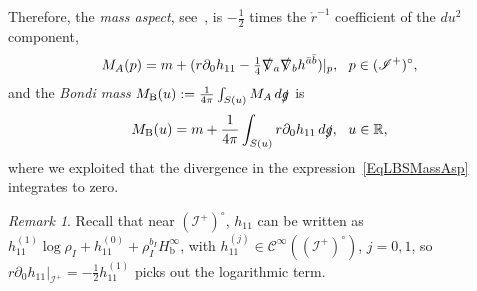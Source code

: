 \documentclass[reqno,11pt,letterpaper]{amsart}
\numberwithin{equation}{section}
\numberwithin{figure}{section}
\theoremstyle{definition}
\theoremstyle{remark}
\newtheorem{rmk}[thm]{Remark}
\newcommand{\mc}{\mathcal}
\newcommand{\cC}{\mc C}
\newcommand{\ms}{\mathscr}
\newcommand{\scri}{\ms I}
\newcommand{\R}{\mathbb{R}}
\newcommand{\slg}{\slashed{g}{}}
\newcommand{\slnabla}{\slashed{\nabla}{}}
\newcommand{\pa}{\partial}
\newcommand{\bop}{{\mathrm{b}}}
\newcommand{\half}{\tfrac{1}{2}}
\newcommand{\CI}{\cC^\infty}
\newcommand{\Hb}{H_{\bop}}
\begin{document}
Therefore, the \emph{mass aspect}, see~\cite[Equation~(37)]{MaedlerWinicourBondi}, is $-\half$ times the $\mathring r^{-1}$ coefficient of the $d u^2$ component,
\begin{equation}
\label{EqLBSMassAsp}
  M_A(p) = m + (r\pa_0 h_{1 1} - \tfrac14\slnabla_a\slnabla_b h^{\bar a\bar b})|_p,\ \ p\in(\scri^+)^\circ,
\end{equation}
and the \emph{Bondi mass} $M_{\rm B}(u):=\frac{1}{4\pi}\int_{S(u)}M_A\,d\slg$ is
\begin{equation}
\label{EqLBSMass}
  M_{\rm B}(u) = m + \frac{1}{4\pi}\int_{S(u)} r\pa_0 h_{1 1}\,d\slg,\ \ u\in\R,
\end{equation}
where we exploited that the divergence in the expression~\eqref{EqLBSMassAsp} integrates to zero.

\begin{rmk}
\label{RmkLBSLog}
  Recall that near $(\scri^+)^\circ$, $h_{1 1}$ can be written as $h_{1 1}^{(1)}\log\rho_I+h_{1 1}^{(0)}+\rho_I^{b_I}\Hb^\infty$, with $h_{1 1}^{(j)}\in\CI((\scri^+)^\circ)$, $j=0,1$, so $r\pa_0 h_{1 1}|_{\scri^+}=-\half h_{1 1}^{(1)}$ picks out the logarithmic term.
\end{rmk}
\end{document}
